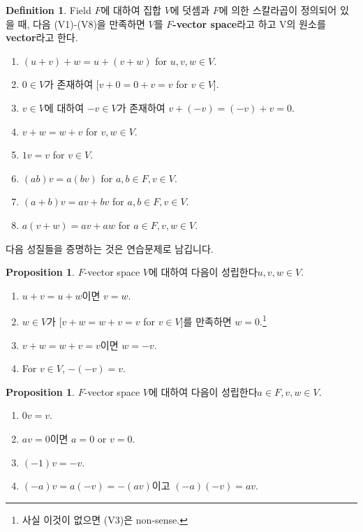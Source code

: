 \documentclass[12pt]{article}
\theoremstyle{definition}
\newtheorem{prop}[thm]{Proposition}
\newtheorem{defn}[thm]{Definition}
\begin{document}
	\begin{defn}
		Field \(F\)에 대하여 집합 \(V\)에 덧셈과 \(F\)에 의한 스칼라곱이 정의되어 있을 때, 다음 (V1)-(V8)을 만족하면 \(V\)를 \textbf{\(F\)-vector space}라고 하고 V의 원소를 \textbf{vector}라고 한다.
		\begin{enumerate}[label=(V\arabic*), leftmargin=2\parindent]
			\item
			\((u+v)+w=u+(v+w)\) for \(u, v, w \in V\).
			\item
			\(0 \in V\)가 존재하여 [\(v+0=0+v=v\) for \(v \in V\)].
			\item
			\(v \in V\)에 대하여 \(-v \in V\)가 존재하여 \(v+(-v)=(-v)+v=0\).
			\item
			\(v+w=w+v\) for \(v, w \in V\).
			\item
			\(1v = v\) for \(v \in V\).
			\item
			\((ab)v = a(bv)\) for \(a, b \in F, v \in V\).
			\item
			\((a+b)v=av+bv\) for \(a, b \in F, v \in V\).
			\item
			\(a(v+w) = av + aw\) for \(a \in F, v, w \in V\).
		\end{enumerate}
	\end{defn}

다음 성질들을 증명하는 것은 연습문제로 남깁니다.

	\begin{prop}
		\(F\)-vector space \(V\)에 대하여 다음이 성립한다\(u, v, w \in V\).
		\begin{enumerate}[label=(\alph*), leftmargin=2\parindent]
			\item
			\(u + v = u + w\)이면 \(v = w\).
			\item
			\(w \in V\)가 [\(v + w = w + v = v\) for \(v \in V\)]를 만족하면 \(w = 0\).\footnote{사실 이것이 없으면 (V3)은 non-sense.}
			\item
			\(v + w = w + v = v\)이면 \(w = -v\).
			\item
			For \(v \in V\), \(-(-v) = v\).
		\end{enumerate}
	\end{prop}

	\begin{prop}
		\(F\)-vector space \(V\)에 대하여 다음이 성립한다\(a \in F, v, w \in V\).
		\begin{enumerate}[label=(\alph*), leftmargin=2\parindent]
			\item
			\(0v = v\).
			\item
			\(av = 0\)이면 \(a = 0\) or \(v = 0\).
			\item
			\((-1)v = -v\).
			\item
			\((-a)v = a(-v) = -(av)\)이고 \((-a)(-v) = av\).
		\end{enumerate}
	\end{prop}
\end{document}

